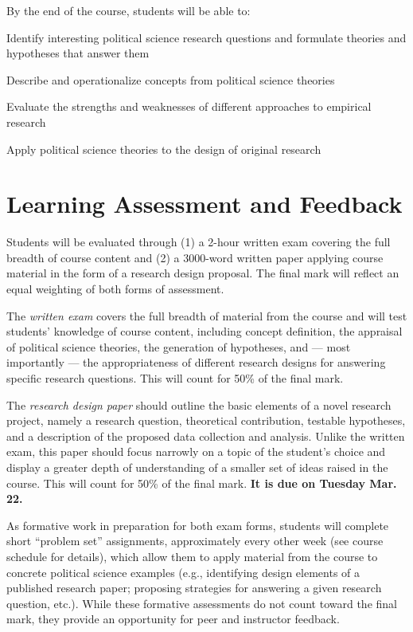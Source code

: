 \documentclass[12pt,a4paper]{article}
\begin{document}
By the end of the course, students will be able to:

\begin{enumerate*}
\item Identify interesting political science research questions and formulate theories and hypotheses that answer them
\item Describe and operationalize concepts from political science theories
\item Evaluate the strengths and weaknesses of different approaches to empirical research
\item Apply political science theories to the design of original research
\end{enumerate*}

\section{Learning Assessment and Feedback}

Students will be evaluated through (1) a 2-hour written exam covering the full breadth of course content and (2) a 3000-word written paper applying course material in the form of a research design proposal. The final mark will reflect an equal weighting of both forms of assessment.

The \textit{written exam} covers the full breadth of material from the course and will test students' knowledge of course content, including concept definition, the appraisal of political science theories, the generation of hypotheses, and --- most importantly --- the appropriateness of different research designs for answering specific research questions. This will count for 50\% of the final mark.

The \textit{research design paper} should outline the basic elements of a novel research project, namely a research question, theoretical contribution, testable hypotheses, and a description of the proposed data collection and analysis. Unlike the written exam, this paper should focus narrowly on a topic of the student's choice and display a greater depth of understanding of a smaller set of ideas raised in the course. This will count for 50\% of the final mark. \textbf{It is due on Tuesday Mar. 22.}

As formative work in preparation for both exam forms, students will complete short ``problem set'' assignments, approximately every other week (see course schedule for details), which allow them to apply material from the course to concrete political science examples (e.g., identifying design elements of a published research paper; proposing strategies for answering a given research question, etc.). While these formative assessments do not count toward the final mark, they provide an opportunity for peer and instructor feedback.
\end{document}
